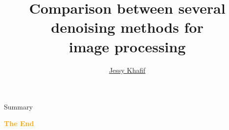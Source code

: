 \documentclass[aspectratio=43]{beamer}
\title{
    Comparison between several \\
    denoising methods for \\ 
    image processing 
} %
\author{
    \href{https://github.com/akhaten}{Jessy Khafif}
}
\begin{document}
    
    \frame{\titlepage}
    
    \begin{frame}{Summary}
        \tableofcontents
    \end{frame}
    
    
    
    
    
    
    
    

    \begin{frame}{}
        \centering
            \Huge\bfseries
        \textcolor{orange}{The End}
    \end{frame}
\end{document}
